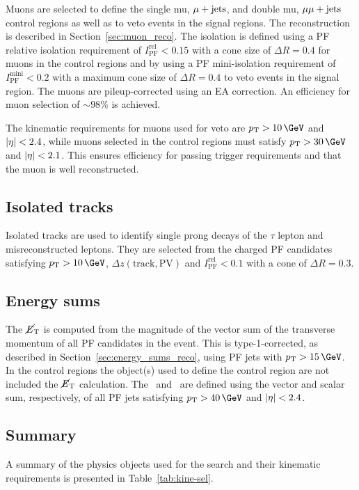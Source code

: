 Muons are selected to define the single mu, $\mu + \textrm{jets}$, and double mu, $\mu\mu + \textrm{jets}$ control regions as well as 
to veto events in the signal regions. The reconstruction is described in Section~\ref{sec:muon_reco}.
The isolation is defined using a PF relative isolation requirement of $I_{\text{PF}}^{\text{rel}} < 0.15$ 
with a cone size of $\Delta R = 0.4$ for muons in the control regions and by using a PF mini-isolation requirement of
$I_{\text{PF}}^{\text{mini}} < 0.2$ with a maximum cone size of $\Delta R = 0.4$ to veto events in the signal region. The muons are pileup-corrected
using an EA correction. An efficiency for muon selection of $\sim98\%$ is achieved.

The kinematic requirements for muons used for veto are $\pt > 10\,\GeV$ and $|\eta| < 2.4$, while muons 
selected in the control regions must satisfy $\pt > 30\,\GeV$ and $|\eta| < 2.1$. This ensures efficiency
for passing trigger requirements and that the muon is well reconstructed.


\subsection{Isolated tracks}

Isolated tracks are used to identify single prong decays of the $\tau$ lepton
and misreconstructed leptons. They are selected from the charged PF candidates 
satisfying $\pt > 10\,\GeV$, $\Delta z(\text{track},\text{PV})$ and 
$I_{\text{PF}}^{\text{rel}} < 0.1$ with a cone of $\Delta R = 0.3$.

\subsection{Energy sums}

The $\mbox{$\cancel{E}_\text{T}$}$ is computed from the magnitude of the vector sum of the transverse momentum of all PF candidates in
the event. This is type-1-corrected, as described in Section~\ref{sec:energy_sums_reco}, 
using PF jets with $\pt > 15\,\GeV$. In the control regions the object(s) used to define
the control region are not included the $\mbox{$\cancel{E}_\text{T}$}$ calculation. The \mht~and \scalht~are defined
using the vector and scalar sum, respectively, of all PF jets satisfying $\pt > 40\,\GeV$ and $|\eta| < 2.4$.

\subsection{Summary}

A summary of the physics objects used for the \alphat search and their
kinematic requirements is presented in Table~\ref{tab:kine-sel}.


